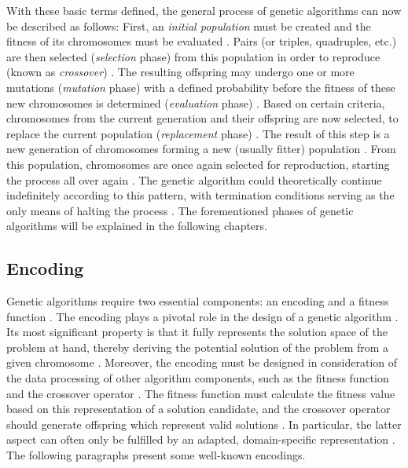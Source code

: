 \documentclass[sigconf]{acmart}
\begin{document}
With these basic terms defined, the general process of genetic algorithms
can now be described as follows:
First, an \textit{initial population} must be created and the fitness of its
chromosomes must be evaluated \cite{Affenzeller2009}.
Pairs (or triples, quadruples, etc.) are then selected
(\textit{selection} phase) from this population in order to reproduce
(known as \textit{crossover}) \cite{Affenzeller2009}.
The resulting offspring may undergo one or more mutations
(\textit{mutation} phase) with a defined probability before the fitness of
these new chromosomes is determined (\textit{evaluation} phase)
\cite{Affenzeller2009}.
Based on certain criteria, chromosomes from the current generation and their
offspring are now selected, to replace the current population
(\textit{replacement} phase) \cite{Affenzeller2009}.
The result of this step is a new generation of chromosomes forming a new
(usually fitter) population \cite{Affenzeller2009}.
From this population, chromosomes are once again selected for reproduction,
starting the process all over again \cite{Affenzeller2009}.
The genetic algorithm could theoretically continue indefinitely according to
this pattern, with termination conditions serving as the only means of halting
the process \cite{Beligiannis2009}.
%
The forementioned phases of genetic algorithms will be explained in the
following chapters.

\subsection{Encoding}
Genetic algorithms require two essential components: an encoding and
a fitness function \cite{Affenzeller2009}.
The encoding plays a pivotal role in the design of a genetic algorithm
\cite{Katoch2021}.
Its most significant property is that it fully represents the solution
space of the problem at hand, thereby deriving the potential solution of the
problem from a given chromosome \cite{Affenzeller2009}.
Moreover, the encoding must be designed in consideration of the data
processing of other algorithm components, such as the fitness function
and the crossover operator \cite{Affenzeller2009}.
The fitness function must calculate the fitness value based on this
representation of a solution candidate, and the crossover operator should
generate offspring which represent valid solutions \cite{Affenzeller2009}.
In particular, the latter aspect can often only be fulfilled by an adapted,
domain-specific representation \cite{Affenzeller2009}.
%
The following paragraphs present some well-known encodings.
\end{document}
